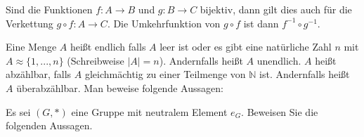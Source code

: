 \documentclass[10pt, a4paper]{exam}
\begin{document}
\begin{questions}
\begin{parts}
\begin{solution}
            Sind die Funktionen $f: A\rightarrow B$ und $g\colon B\to C$ bijektiv, dann gilt dies auch für die Verkettung $g\circ f\colon A\to C$. Die Umkehrfunktion von $g\circ f$ ist dann $f^{-1}\circ g^{-1}$.
        \end{solution}
    \end{parts}

    \question Eine Menge $A$ heißt endlich falls $A$ leer ist oder es gibt eine natürliche Zahl $n$ mit $A\approx\{1, ..., n\}$ (Schreibweise $|A| = n$). Andernfalls heißt $A$ unendlich. $A$ heißt abzählbar, falls $A$ gleichmächtig zu einer Teilmenge von $\mathbb{N}$ ist. Andernfalls heißt $A$ überabzählbar. Man beweise folgende Aussagen:

    \question Es sei $(G, \ast)$ eine Gruppe mit neutralem Element $e_G$. Beweisen Sie die folgenden Aussagen.
\end{questions}
\end{document}
